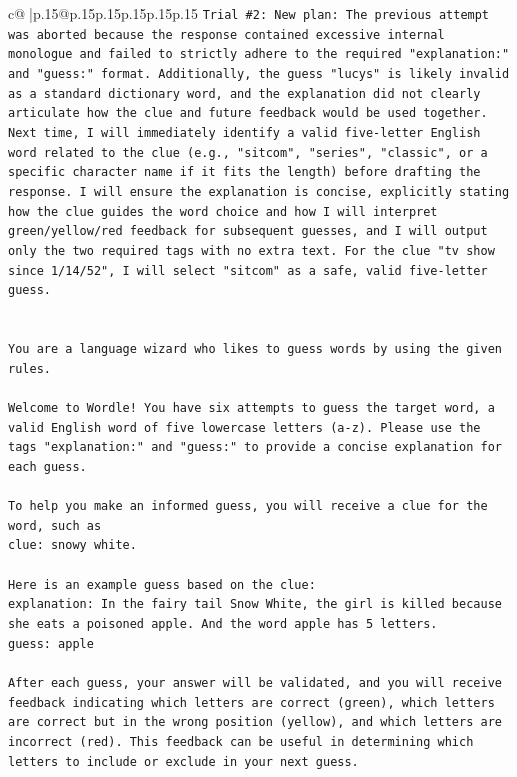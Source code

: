 \documentclass{article}
\begin{document}
{\begin{supertabular}{c@{$\;$}|p{.15\linewidth}@{}p{.15\linewidth}p{.15\linewidth}p{.15\linewidth}p{.15\linewidth}p{.15\linewidth}}
{{{\texttt{Trial \#2: New plan: The previous attempt was aborted because the response contained excessive internal monologue and failed to strictly adhere to the required "explanation:" and "guess:" format. Additionally, the guess "lucys" is likely invalid as a standard dictionary word, and the explanation did not clearly articulate how the clue and future feedback would be used together. Next time, I will immediately identify a valid five{-}letter English word related to the clue (e.g., "sitcom", "series", "classic", or a specific character name if it fits the length) before drafting the response. I will ensure the explanation is concise, explicitly stating how the clue guides the word choice and how I will interpret green/yellow/red feedback for subsequent guesses, and I will output only the two required tags with no extra text. For the clue "tv show since 1/14/52", I will select "sitcom" as a safe, valid five{-}letter guess.} \\
\\ 
\\ 
\texttt{You are a language wizard who likes to guess words by using the given rules.} \\
\\ 
\texttt{Welcome to Wordle! You have six attempts to guess the target word, a valid English word of five lowercase letters (a{-}z). Please use the tags "explanation:" and "guess:" to provide a concise explanation for each guess.} \\
\\ 
\texttt{To help you make an informed guess, you will receive a clue for the word, such as} \\
\texttt{clue: snowy white.} \\
\\ 
\texttt{Here is an example guess based on the clue:} \\
\texttt{explanation: In the fairy tail Snow White, the girl is killed because she eats a poisoned apple. And the word apple has 5 letters.} \\
\texttt{guess: apple} \\
\\ 
\texttt{After each guess, your answer will be validated, and you will receive feedback indicating which letters are correct (green), which letters are correct but in the wrong position (yellow), and which letters are incorrect (red). This feedback can be useful in determining which letters to include or exclude in your next guess.} \\
\\ 
}}}
\end{supertabular}}
\end{document}
